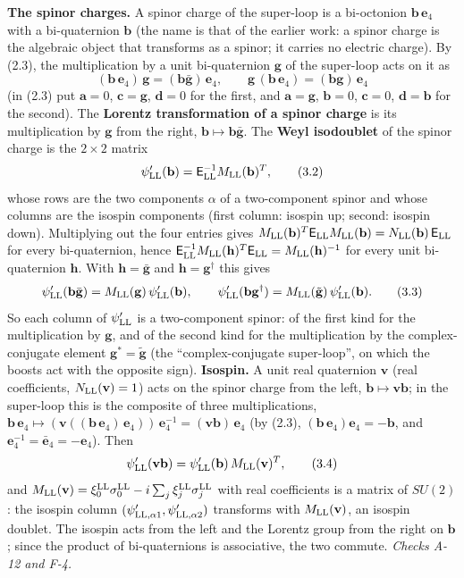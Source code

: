 \documentclass[
  10pt,
]{article}
\begin{document}
\textbf{The spinor charges.} A spinor charge of the super-loop is a
bi-octonion \(\mathbf b\,\mathbf e_4\) with a bi-quaternion
\(\mathbf b\) (the name is that of the earlier work: a spinor charge is
the algebraic object that transforms as a spinor; it carries no electric
charge). By (2.3), the multiplication by a unit bi-quaternion
\(\mathbf g\) of the super-loop acts on it as
\[(\mathbf b\,\mathbf e_4)\,\mathbf g=(\mathbf b\bar{\mathbf g})\,\mathbf e_4,\qquad\mathbf g\,(\mathbf b\,\mathbf e_4)=(\mathbf b\mathbf g)\,\mathbf e_4\tag{3.1}\]
(in (2.3) put \(\mathbf a=0\), \(\mathbf c=\mathbf g\), \(\mathbf d=0\)
for the first, and \(\mathbf a=\mathbf g\), \(\mathbf b=0\),
\(\mathbf c=0\), \(\mathbf d=\mathbf b\) for the second). The
\textbf{Lorentz transformation of a spinor charge} is its multiplication
by \(\mathbf g\) from the right,
\(\mathbf b\mapsto\mathbf b\bar{\mathbf g}\). The \textbf{Weyl
isodoublet} of the spinor charge is the \(2\times2\) matrix
\[\psi'_{\rm LL}(\mathbf b)=\mathsf E_{\rm LL}^{-1}M_{\rm LL}(\mathbf b)^T,\tag{3.2}\]
whose rows are the two components \(\alpha\) of a two-component spinor
and whose columns are the isospin components (first column: isospin up;
second: isospin down). Multiplying out the four entries gives
\(M_{\rm LL}(\mathbf b)^T\mathsf E_{\rm LL}M_{\rm LL}(\mathbf b)=N_{\rm LL}(\mathbf b)\,\mathsf E_{\rm LL}\)
for every bi-quaternion, hence
\(\mathsf E_{\rm LL}^{-1}M_{\rm LL}(\mathbf h)^T\mathsf E_{\rm LL}=M_{\rm LL}(\mathbf h)^{-1}\)
for every unit bi-quaternion \(\mathbf h\). With
\(\mathbf h=\bar{\mathbf g}\) and \(\mathbf h=\mathbf g^\dagger\) this
gives
\[\psi'_{\rm LL}(\mathbf b\bar{\mathbf g})=M_{\rm LL}(\mathbf g)\,\psi'_{\rm LL}(\mathbf b),\qquad\psi'_{\rm LL}(\mathbf b\mathbf g^\dagger)=M_{\rm LL}(\tilde{\mathbf g})\,\psi'_{\rm LL}(\mathbf b).\tag{3.3}\]
So each column of \(\psi'_{\rm LL}\) is a two-component spinor: of the
first kind for the multiplication by \(\mathbf g\), and of the second
kind for the multiplication by the complex-conjugate element
\(\mathbf g^*=\tilde{\mathbf g}\) (the ``complex-conjugate super-loop'',
on which the boosts act with the opposite sign). \textbf{Isospin.} A
unit real quaternion \(\mathbf v\) (real coefficients,
\(N_{\rm LL}(\mathbf v)=1\)) acts on the spinor charge from the left,
\(\mathbf b\mapsto\mathbf v\mathbf b\); in the super-loop this is the
composite of three multiplications,
\(\mathbf b\,\mathbf e_4\mapsto(\mathbf v((\mathbf b\,\mathbf e_4)\,\mathbf e_4))\,\mathbf e_4^{-1}=(\mathbf v\mathbf b)\,\mathbf e_4\)
(by (2.3), \((\mathbf b\,\mathbf e_4)\mathbf e_4=-\mathbf b\), and
\(\mathbf e_4^{-1}=\bar{\mathbf e}_4=-\mathbf e_4\)). Then
\[\psi'_{\rm LL}(\mathbf v\mathbf b)=\psi'_{\rm LL}(\mathbf b)\,M_{\rm LL}(\mathbf v)^T,\tag{3.4}\]
and
\(M_{\rm LL}(\mathbf v)=\xi^{\rm LL}_0\sigma^{\rm LL}_0-i\sum_j\xi^{\rm LL}_j\sigma^{\rm LL}_j\)
with real coefficients is a matrix of \(SU(2)\): the isospin column
\((\psi'_{{\rm LL},\alpha1},\psi'_{{\rm LL},\alpha2})\) transforms with
\(M_{\rm LL}(\mathbf v)\), an isospin doublet. The isospin acts from the
left and the Lorentz group from the right on \(\mathbf b\); since the
product of bi-quaternions is associative, the two commute. \emph{Checks
A-12 and F-4.}
\end{document}
